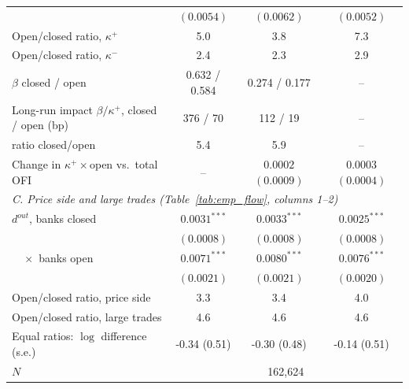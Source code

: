 \begin{tabular}{lccc}
 & $(0.0054)$ & $(0.0062)$ & $(0.0052)$ \\
Open/closed ratio, $\kappa^+$ & 5.0 & 3.8 & 7.3 \\
Open/closed ratio, $\kappa^-$ & 2.4 & 2.3 & 2.9 \\
$\beta$ closed / open & 0.632 / 0.584 & 0.274 / 0.177 & -- \\
Long-run impact $\beta/\kappa^+$, closed / open (bp) & 376 / 70 & 112 / 19 & -- \\
\quad ratio closed/open & 5.4 & 5.9 & -- \\
Change in $\kappa^+\times$open vs.\ total OFI & -- & $0.0002$ $(0.0009)$ & $0.0003$ $(0.0004)$ \\
\midrule
\multicolumn{4}{l}{\emph{C. Price side and large trades (Table~\ref{tab:emp_flow}, columns 1--2)}} \\
$d^{out}$, banks closed & $0.0031^{***}$ & $0.0033^{***}$ & $0.0025^{***}$ \\
 & $(0.0008)$ & $(0.0008)$ & $(0.0008)$ \\
$\quad\times$ banks open & $0.0071^{***}$ & $0.0080^{***}$ & $0.0076^{***}$ \\
 & $(0.0021)$ & $(0.0021)$ & $(0.0020)$ \\
Open/closed ratio, price side & 3.3 & 3.4 & 4.0 \\
Open/closed ratio, large trades & 4.6 & 4.6 & 4.6 \\
Equal ratios: $\log$ difference (s.e.) & -0.34 (0.51) & -0.30 (0.48) & -0.14 (0.51) \\
$N$ & \multicolumn{3}{c}{162,624} \\
\bottomrule
\end{tabular}
